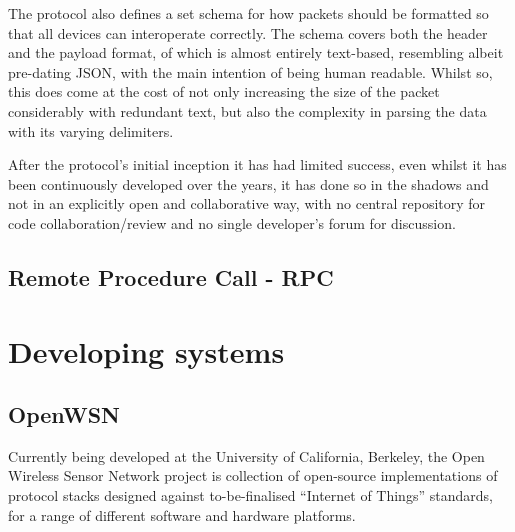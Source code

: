 The protocol also defines a set schema for how packets should be formatted so that all devices can interoperate correctly. The schema covers both the header and the payload format, of which is almost entirely text-based, resembling albeit pre-dating JSON, with the main intention of being human readable. Whilst so, this does come at the cost of not only increasing the size of the packet considerably with redundant text, but also the complexity in parsing the data with its varying delimiters. 

After the protocol's initial inception it has had limited success, even whilst it has been continuously developed over the years, it has done so in the shadows and not in an explicitly open and collaborative way, with no central repository for code collaboration/review and no single developer's forum for discussion. %

\subsection{Remote Procedure Call - RPC} %
\label{sub:rpc}


\section{Developing systems} %
\label{sec:developing_systems}

\subsection{OpenWSN} %
\label{sub:owsn_berkeley}
Currently being developed at the University of California, Berkeley, the Open Wireless Sensor Network project is collection of open-source implementations of protocol stacks designed against to-be-finalised ``Internet of Things'' standards, for a range of different software and hardware platforms.

